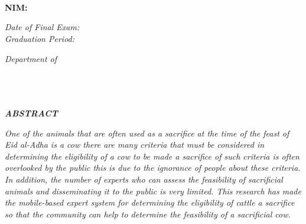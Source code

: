 %
%
%
%

\chapter*{\MakeUppercase{\textit{\judulInggris}}}

\fontsize{14}{16.8}
\begin{center}
	\vspace{0.3cm}
	\MakeUppercase{\textbf{\penulis}}\\
	\MakeUppercase{\textbf{NIM: \nim}}\\
	\fontsize{12}{14.4}
	\vspace{0.7cm}

	\textit{Date of Final Exam: \tanggalSidangInggris}\\
	\textit{Graduation Period:}\ \ \ \ \ \ \ \ \ \ \ \ \ \ \ \ \ \ \ \ \ \ \ \ \ \ \ \ \ \ \ \ \ \ \ \ \ \ 

	\vspace{0.7cm}
	\emph{Department of \programStudiInggris}\\
	\textit{\fakultasInggris}\\
	\universitasInggris\\
	\alamatUniversitasInggris\\

	\vspace{0.7cm}
\end{center}

\fontsize{12}{14.4}
\begin{center}\MakeUppercase{\textbf{\emph{Abstract}}}\end{center}

\noindent
\fontsize{10pt}{12pt}\selectfont
\emph{One of the animals that are often used as a sacrifice at the time of the feast of Eid al-Adha is a cow there are many criteria that must be considered in determining the eligibility of a cow to be made a sacrifice of such criteria is often overlooked by the public this is due to the ignorance of people about these criteria. In addition, the number of experts who can assess the feasibility of sacrificial animals and disseminating it to the public is very limited. This research has made the mobile-based expert system for determining the eligibility of cattle a sacrifice so that the community can help to determine the feasibility of a sacrificial cow.}\\
 \\